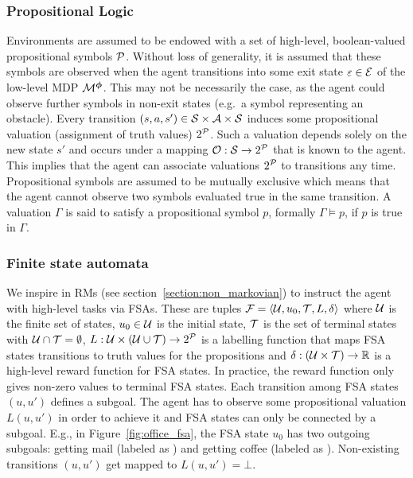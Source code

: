 \subsubsection{Propositional Logic} Environments are assumed to be endowed with a set of high-level, boolean-valued propositional symbols $\mathcal{P}$. Without loss of generality, it is assumed that these symbols are observed when the agent transitions into some exit state $\varepsilon\in\mathcal{E}$ of the low-level MDP $\mathcal{M}^{\boldsymbol{\phi}}$. This may not be necessarily the case, as the agent could observe further symbols in non-exit states (e.g.~a symbol representing an obstacle). Every transition $(s, a, s')\in\mathcal{S}\times\mathcal{A}\times\mathcal{S}$ induces some propositional valuation (assignment of truth values) $2^{\mathcal{P}}$. Such a valuation depends solely on the new state $s'$ and occurs under a mapping ${\mathcal{O}:\mathcal{S}\rightarrow2^{\mathcal{P}}}$ that is known to the agent. This implies that the agent can associate valuations $2^{\mathcal{P}}$ to transitions any time. Propositional symbols are assumed to be mutually exclusive which means that the agent cannot observe two symbols evaluated true in the same transition. A valuation $\Gamma$ is said to satisfy a propositional symbol $p$, formally $\Gamma\vDash p$, if $p$ is true in $\Gamma$. 

\subsubsection{Finite state automata} We inspire in RMs (see section~\ref{section:non_markovian}) to instruct the agent with high-level tasks via FSAs. These are tuples ${\mathcal{F}=\langle \mathcal{U},u_0,\mathcal{T},L,\delta\rangle}$ where $\mathcal{U}$ is the finite set of states, $u_0\in\mathcal{U}$ is the initial state, $\mathcal{T}$ is the set of terminal states with $\mathcal{U}\cap\mathcal{T}=\emptyset$, $L:\mathcal{U}\times(\mathcal{U}\cup\mathcal{T})\rightarrow 2^{\mathcal{P}}$ is a labelling function that maps FSA states transitions to truth values for the propositions and $\delta:(\mathcal{U}\times\mathcal{T})\rightarrow \mathbb{R}$ is a high-level reward function for FSA states. In practice, the reward function only gives non-zero values to terminal FSA states. Each transition among FSA states $(u, u')$ defines a subgoal. The agent has to observe some propositional valuation $L(u, u')$ in order to achieve it and FSA states can only be connected by a subgoal. E.g., in Figure~\ref{fig:office_fsa}, the FSA state $u_0$ has two outgoing subgoals: getting mail (labeled as \mail) and getting coffee (labeled as \coffee). Non-existing transitions $(u, u')$ get mapped to $L(u, u')=\bot$. %


